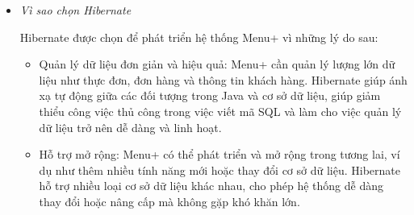 \begin{enumerate}[(a)]
\begin{itemize}
		      \item \textit{Vì sao chọn Hibernate}

		            Hibernate được chọn để phát triển hệ thống Menu+ vì những lý do sau:

		            \begin{itemize}
			            \item Quản lý dữ liệu đơn giản và hiệu quả: Menu+ cần quản lý lượng lớn dữ liệu như thực đơn, đơn hàng và thông tin khách hàng. Hibernate giúp ánh xạ tự động giữa các đối tượng trong Java và cơ sở dữ liệu, giúp giảm thiểu công việc thủ công trong việc viết mã SQL và làm cho việc quản lý dữ liệu trở nên dễ dàng và linh hoạt.
			            \item Hỗ trợ mở rộng: Menu+ có thể phát triển và mở rộng trong tương lai, ví dụ như thêm nhiều tính năng mới hoặc thay đổi cơ sở dữ liệu. Hibernate hỗ trợ nhiều loại cơ sở dữ liệu khác nhau, cho phép hệ thống dễ dàng thay đổi hoặc nâng cấp mà không gặp khó khăn lớn.
		            \end{itemize}
	      \end{itemize}


\end{enumerate}

